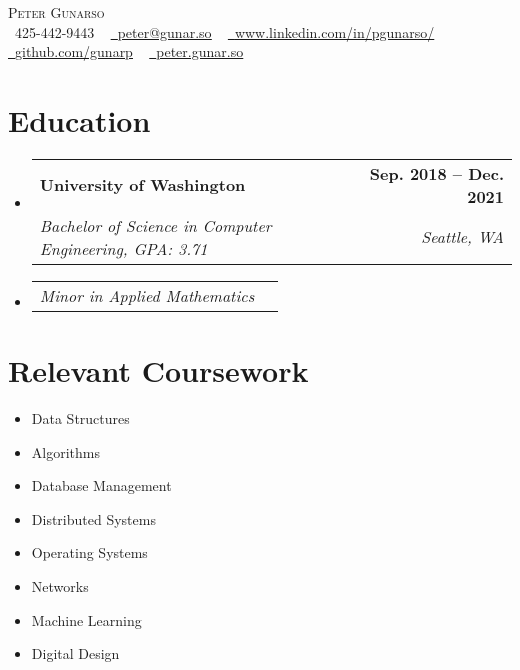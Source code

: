 \documentclass[letterpaper,11pt]{article}
\makeatletter
\newcommand{\resumeSubheading}[4]{
  \vspace{-2pt}\item
    \begin{tabular*}{1.0\textwidth}[t]{l@{\extracolsep{\fill}}r}
      \textbf{#1} & \textbf{\small #2} \\
      \textit{\small#3} & \textit{\small #4} \\
    \end{tabular*}\vspace{-7pt}
}
\newcommand{\resumeSubSubheading}[2]{
    \item
    \begin{tabular*}{0.97\textwidth}{l@{\extracolsep{\fill}}r}
      \textit{\small#1} & \textit{\small #2} \\
    \end{tabular*}\vspace{-7pt}
}
\newcommand{\resumeSubHeadingListStart}{\begin{itemize}[leftmargin=0.0in, label={}]}
\newcommand{\resumeSubHeadingListEnd}{\end{itemize}}
\makeatother
\begin{document}

\begin{center}
    {\Huge \scshape Peter Gunarso} \\ \vspace{5pt}
    \small \raisebox{-0.1\height}\faPhone\ 425-442-9443 ~ \href{mailto:peter@gunar.so}{\raisebox{-0.2\height}\faEnvelope\  \underline{peter@gunar.so}} ~
    \href{https://www.linkedin.com/in/pgunarso/}{\raisebox{-0.2\height}\faLinkedin\ \underline{www.linkedin.com/in/pgunarso/}}  ~
    \href{https://github.com/gunarp}{\raisebox{-0.2\height}\faGithub\ \underline{github.com/gunarp}} ~
    \href{http://peter.gunar.so}{\raisebox{-0.2\height}\faInternetExplorer\ \underline{peter.gunar.so}}
    \vspace{-8pt}
\end{center}


\section{Education}
  \resumeSubHeadingListStart
    \resumeSubheading
      {University of Washington}{Sep. 2018 -- Dec. 2021}
      {Bachelor of Science in Computer Engineering, GPA: 3.71}{Seattle, WA}
    \resumeSubSubheading
      {Minor in Applied Mathematics}{}
  \resumeSubHeadingListEnd

\section{Relevant Coursework}
        \begin{multicols}{4}
            \begin{itemize}[itemsep=-5pt, parsep=3pt]
                \item\small Data Structures
                \item Algorithms
                \item Database Management
                \item Distributed Systems
                \item Operating Systems
                \item Networks
                \item Machine Learning
                \item Digital Design
            \end{itemize}
        \end{multicols}
        \vspace*{2.0\multicolsep}
\end{document}
